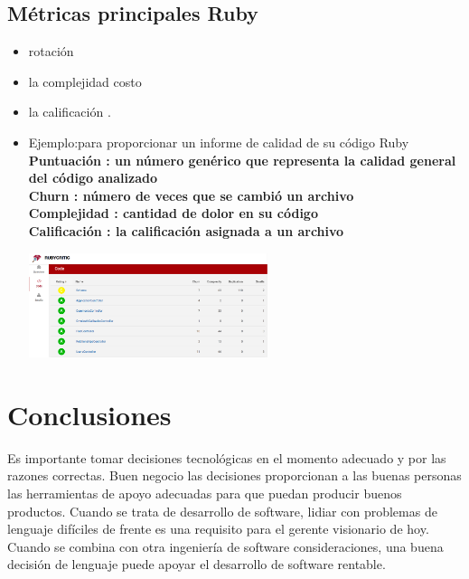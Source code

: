 \documentclass[twoside,twocolumn]{article}
\begin{document}
\subsection {Métricas principales Ruby}
\begin{itemize}
\item rotación 
\item la complejidad 
\itemel costo 
\item la calificación .
\item  Ejemplo:para proporcionar un informe de calidad de su código Ruby
\\ \textbf{ Puntuación : un número genérico que representa la calidad general del código analizado }
\\ \textbf{ Churn : número de veces que se cambió un archivo}
\\ \textbf{ Complejidad : cantidad de dolor en su código}
\\ \textbf{ Calificación : la calificación asignada a un archivo}
\begin{center}
	\includegraphics[width=7cm]{./Imagenes/rating} 
	\end{center}
\end{itemize}

\section{Conclusiones}
Es importante tomar decisiones tecnológicas en el momento adecuado y por las razones correctas. Buen negocio
las decisiones proporcionan a las buenas personas las herramientas de apoyo adecuadas para que puedan producir buenos productos.
Cuando se trata de desarrollo de software, lidiar con problemas de lenguaje difíciles de frente es una
requisito para el gerente visionario de hoy. Cuando se combina con otra ingeniería de software
consideraciones, una buena decisión de lenguaje puede apoyar el desarrollo de software rentable.


\end{document}
